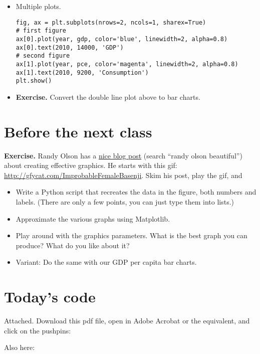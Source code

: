 \documentclass[11pt]{article}
\begin{document}
\begin{itemize}
\item Multiple plots.
\begin{verbatim}
fig, ax = plt.subplots(nrows=2, ncols=1, sharex=True)
# first figure
ax[0].plot(year, gdp, color='blue', linewidth=2, alpha=0.8)
ax[0].text(2010, 14000, 'GDP')
# second figure
ax[1].plot(year, pce, color='magenta', linewidth=2, alpha=0.8)
ax[1].text(2010, 9200, 'Consumption')
plt.show()
\end{verbatim}

\item {\bf Exercise.}
Convert the double line plot above to bar charts.


\end{itemize}



\section{Before the next class}

{\bf Exercise.}
Randy Olson has a
\href{http://www.randalolson.com/2014/06/28/how-to-make-beautiful-data-visualizations-in-python-with-matplotlib/}
{nice blog post} (search ``randy olson beautiful'')
about creating effective graphics.
He starts with this gif:
\url{http://gfycat.com/ImprobableFemaleBasenji}.
Skim his post, play the gif, and
%
\begin{itemize}
\item  Write a Python script that recreates the data in the figure,
both numbers and labels.
(There are only a few points, you can just type them into lists.)
\item Approximate the various graphs using Matplotlib.
\item Play around with the graphics parameters.
What is the best graph you can produce?
What do you like about it?
\item Variant:  Do the same with our GDP per capita bar charts.
\end{itemize}


\section*{Today's code}

Attached.  Download this pdf file, open in Adobe Acrobat or the equivalent,
and click on the pushpins:

Also here:
{\small

}
\end{document}
